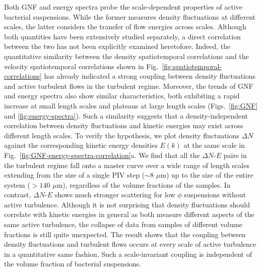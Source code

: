 \documentclass[twocolumn,aps,prx,amsmath,amssymb,longbibliography,superscriptaddress]{revtex4-2}
\begin{document}
Both GNF and energy spectra probe the scale-dependent properties of active bacterial suspensions. While the former measures density fluctuations at different scales, the latter considers the transfer of flow energies %
across scales. Although both quantities have been extensively studied separately, a direct correlation between the two has not been explicitly examined heretofore. Indeed, the quantitative similarity between the density spatiotemporal correlations and the velocity spatiotemporal correlations shown in Fig.~\ref{fig:spatiotemporal-correlations} has already indicated a strong coupling between density fluctuations and active turbulent flows in the turbulent regime. Moreover, the trends of GNF and energy spectra also show similar characteristics, both exhibiting a rapid increase at small length scales and plateaus at large length scales (Figs.~\ref{fig:GNF} and \ref{fig:energy-spectra}). Such a similarity suggests that a density-independent correlation between density fluctuations and kinetic energies may exist across different length scales. To verify the hypothesis, we plot density fluctuations $\Delta N$ against the corresponding kinetic energy densities $E(k)$ at the same scale in Fig.~\ref{fig:GNF-energy-spectra-correlation}a. We find that all the $\Delta N$-$E$ pairs in the turbulent regime fall onto a master curve over a wide range of length scales extending from the size of a single PIV step ($\sim 8$ $\mu$m) up to the size of the entire system ($> 140$ $\mu$m), regardless of the volume fractions of the samples.
In contrast, $\Delta N$-$E$ shows much stronger scattering for low $\phi$ suspensions without active turbulence. Although it is not surprising that density fluctuations should correlate with kinetic energies in general as both measure different aspects of the same active turbulence, the collapse of data from samples of different volume fractions is still quite unexpected.
The result shows that the coupling between density fluctuations and turbulent flows occurs at every scale of active turbulence in a quantitative same fashion. Such a scale-invariant coupling is independent of the volume fraction of bacterial suspensions.
\end{document}

